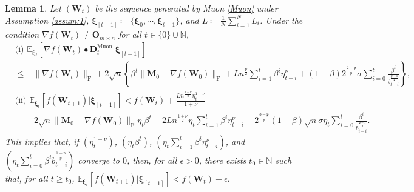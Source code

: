 \documentclass[twoside,11pt]{article}
\newtheorem{lem}{Lemma}[section]
\begin{document}
\begin{lem}\label{lem:muon_descent}
{\em 
Let $(\bm{W}_t)$ be the sequence generated by Muon \eqref{Muon} under Assumption \ref{assum:1}, $\bm{\xi}_{[t-1]} \coloneqq \{ \bm{\xi}_0, \cdots, \bm{\xi}_{t-1} \}$, and $L \coloneqq \frac{1}{N} \sum_{i=1}^N L_i$. Under the condition $\nabla f (\bm{W}_t) \neq \bm{O}_{m \times n}$ for all $t \in \{0\} \cup \mathbb{N}$,
\begin{align*}
&\text{(i) }
\mathbb{E}_{\bm{\xi}_t} \left[ \nabla f (\bm{W}_t) \bullet \bm{D}_t^{\mathrm{Muon}} |\bm{\xi}_{[t-1]} \right]\\
&\leq - \| \nabla f (\bm{W}_t) \|_{\mathrm{F}}
+ 2 \sqrt{n}
\left\{  
\beta^t \| \bm{M}_{0} - \nabla f(\bm{W}_{0}) \|_{\mathrm{F}}
+ L n^{\frac{\nu}{2}} \sum_{i=1}^t \beta^i \eta_{t-i}^\nu 
+ (1 - \beta) 2^{\frac{2 - \mathfrak{p}}{\mathfrak{p}}} \sigma
\sum_{i=0}^t 
\frac{\beta^i}{b_{t-i}^{\frac{\mathfrak{p} -1}{\mathfrak{p}}}}
\right\},\\
&\text{(ii) } 
\mathbb{E}_{\bm{\xi}_t} \left[f (\bm{W}_{t+1}) |\bm{\xi}_{[t-1]} \right]
<
f(\bm{W}_t)
+ 
\frac{L n^{\frac{1 + \nu}{2}} \eta_t^{1 + \nu}}{1 + \nu}\\
&\quad + 2 \sqrt{n} \| \bm{M}_{0} - \nabla f(\bm{W}_{0}) \|_{\mathrm{F}} \eta_t \beta^t
+ 2 L n^{\frac{1+\nu}{2}} \eta_t \sum_{i=1}^t \beta^i \eta_{t-i}^\nu
+ 2^{\frac{3 - \mathfrak{p}}{\mathfrak{p}}} (1 - \beta) \sqrt{n} \sigma \eta_t \sum_{i=0}^t 
\frac{\beta^i}{b_{t-i}^{\frac{\mathfrak{p} -1}{\mathfrak{p}}}}.
\end{align*}
This implies that, if $(\eta_t^{1 + \nu})$, $(\eta_t \beta^t)$, $(\eta_t \sum_{i=1}^t \beta^i \eta_{t-i}^\nu)$, and $(\eta_t \sum_{i=0}^t \beta^i b_{t-i}^{\frac{1- \mathfrak{p}}{\mathfrak{p}}})$ converge to $0$, then, for all $\epsilon > 0$, there exists $t_0 \in \mathbb{N}$ such that, for all $t \geq t_0$, $\mathbb{E}_{\bm{\xi}_t} \left[f (\bm{W}_{t+1}) |\bm{\xi}_{[t-1]} \right] < f(\bm{W}_t) + \epsilon$. 
}
\end{lem}
\end{document}

